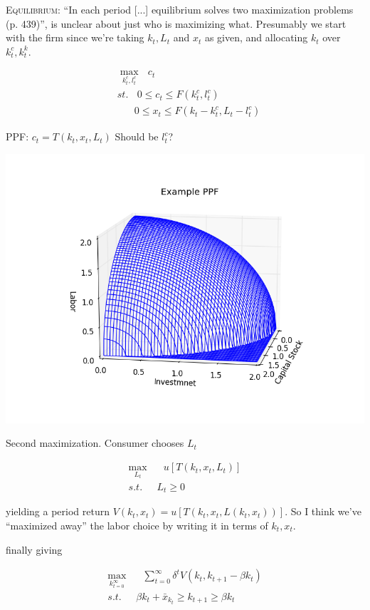 \documentclass[11pt]{article}
\begin{document}
  \textsc{Equilibrium}: ``In each period [...] equilibrium solves two maximization problems (p. 439)'', is unclear about just who is maximizing what.  Presumably we start with the firm since we're taking $k_t, L_t$ and $x_t$ as given, and allocating $k_t$ over $k_t^c, k_t^k$.
  

  \begin{align}
    &\max_{k^c_t, l^c_t}  \ \ \ c_t\\
    &st. \ \ \ \ 0 \leq c_t \leq F(k_t^c, l_t^c)\\
    & \ \ \ \, \ \ \ \ 0 \leq x_t \leq F(k_t - k_t^c, L_t - l_t^c)
  \end{align}

  PPF: $c_t = T(k_t, x_t, L_t)$ Should be $l^c_t$?
  \begin{center}
    \includegraphics[scale=.31]{example_ppf_wire.png}
    \label{fig:ppf}
  \end{center}

  Second maximization.  Consumer chooses $L_t$

  \begin{align}
    \max_{L_t} & \ \ \  u[T(k_t, x_t, L_t)] \\
    s.t. \ \ \ & L_t \geq 0
  \end{align}

  yielding a period return $V(k_t, x_t) = u[T(k_t, x_t, L(k_t, x_t))]$.  So I think we've ``maximized away'' the labor choice by writing it in terms of $k_t, x_t$.

  finally giving

  \begin{align}
    \max_{k_{t=0}^\infty} & \ \ \ \sum_{t=0}^{\infty} \delta^t V(k_t, k_{t+1} - \beta k_t)\\
    s.t. \ \ \ & \beta k_t + \bar{x}_{k_t} \geq k_{t+1} \geq \beta k_t
  \end{align}
\end{document}
